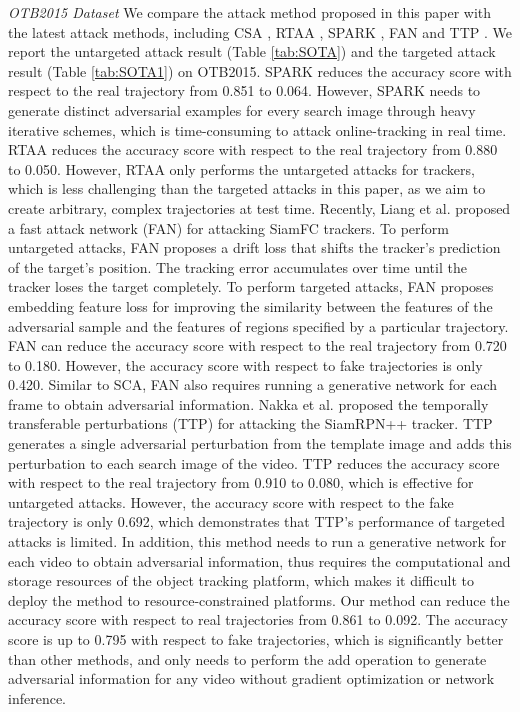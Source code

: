 \documentclass[journal]{IEEEtran}
\begin{document}

\textit{OTB2015 Dataset} We compare the attack method proposed in this paper with the latest attack methods, including CSA \cite{CSA}, RTAA \cite{RTAA}, SPARK \cite{SPARK}, FAN \cite{FAN} and TTP \cite{TTP}. We report the untargeted attack result (Table \ref{tab:SOTA}) and the targeted attack result (Table \ref{tab:SOTA1}) on OTB2015.
SPARK \cite{SPARK} reduces the accuracy score with respect to the real trajectory from 0.851 to 0.064. However, SPARK needs to generate distinct adversarial examples for every search image through heavy iterative schemes, which is time-consuming to attack online-tracking in real time.
RTAA \cite{RTAA} reduces the accuracy score with respect to the real trajectory from 0.880 to 0.050. However, RTAA only performs the untargeted attacks for trackers, which is less challenging than the targeted attacks in this paper, as we aim to create arbitrary, complex trajectories at test time. 
Recently, Liang et al. proposed a fast attack network (FAN) \cite{FAN} for attacking SiamFC trackers. To perform untargeted attacks, FAN proposes a drift loss that shifts the tracker's prediction of the target's position. The tracking error accumulates over time until the tracker loses the target completely. To perform targeted attacks, FAN proposes embedding feature loss for improving the similarity between the features of the adversarial sample and the features of regions specified by a particular trajectory. FAN can reduce the accuracy score with respect to the real trajectory from 0.720 to 0.180. However, the accuracy score with respect to fake trajectories is only 0.420. Similar to SCA, FAN also requires running a generative network for each frame to obtain adversarial information. Nakka et al. \cite{TTP} proposed the temporally transferable perturbations (TTP) for attacking the SiamRPN++ tracker. TTP generates a single adversarial perturbation from the template image and adds this perturbation to each search image of the video. TTP reduces the accuracy score with respect to the real trajectory from 0.910 to 0.080, which is effective for untargeted attacks. However, the accuracy score with respect to the fake trajectory is only 0.692, which demonstrates that TTP's performance of targeted attacks is limited. In addition, this method needs to run a generative network for each video to obtain adversarial information, thus requires the computational and storage resources of the object tracking platform, which makes it difficult to deploy the method to resource-constrained platforms. Our method can reduce the accuracy score with respect to real trajectories from 0.861 to 0.092. The accuracy score is up to 0.795 with respect to fake trajectories, which is significantly better than other methods, and only needs to perform the add operation to generate adversarial information for any video without gradient optimization or network inference.
\end{document}

